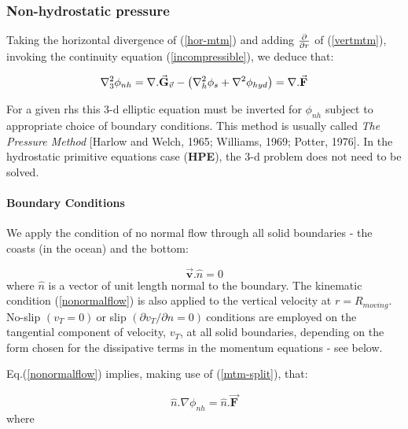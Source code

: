 \subsubsection{Non-hydrostatic pressure}

Taking the horizontal divergence of (\ref{hor-mtm}) and adding $\frac{%
\partial }{\partial r}$ of (\ref{vertmtm}), invoking the continuity equation
(\ref{incompressible}), we deduce that:

\begin{equation}
\nabla _{3}^{2}\phi _{nh}=\nabla .\vec{\mathbf{G}}_{\vec{v}}-\left( \mathbf{%
\nabla }_{h}^{2}\phi _{s}+\mathbf{\nabla }^{2}\phi _{hyd}\right) =\nabla .%
\vec{\mathbf{F}}  \label{3dinvert}
\end{equation}

For a given rhs this 3-d elliptic equation must be inverted for $\phi _{nh}$
subject to appropriate choice of boundary conditions. This method is usually
called \textit{The Pressure Method} [Harlow and Welch, 1965; Williams, 1969;
Potter, 1976]. In the hydrostatic primitive equations case (\textbf{HPE}),
the 3-d problem does not need to be solved.

\paragraph{Boundary Conditions}

We apply the condition of no normal flow through all solid boundaries - the
coasts (in the ocean) and the bottom:

\begin{equation}
\vec{\mathbf{v}}.\widehat{n}=0  \label{nonormalflow}
\end{equation}
where $\widehat{n}$ is a vector of unit length normal to the boundary. The
kinematic condition (\ref{nonormalflow}) is also applied to the vertical
velocity at $r=R_{moving}$. No-slip $\left( v_{T}=0\right) \ $or slip $%
\left( \partial v_{T}/\partial n=0\right) \ $conditions are employed on the
tangential component of velocity, $v_{T}$, at all solid boundaries,
depending on the form chosen for the dissipative terms in the momentum
equations - see below.

Eq.(\ref{nonormalflow}) implies, making use of (\ref{mtm-split}), that:

\begin{equation}
\widehat{n}.\nabla \phi _{nh}=\widehat{n}.\vec{\mathbf{F}}
\label{inhomneumann}
\end{equation}
where

